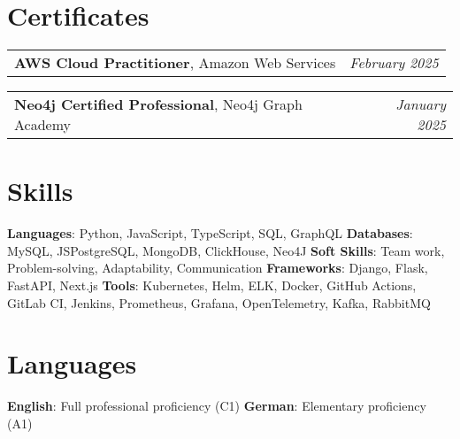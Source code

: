 \documentclass[letterpaper,11pt]{article}
\makeatletter
\newcommand{\titleWithDescription}[2]{\textbf{#1}{: #2}}
\newcommand{\resumeLanguages}[4]{
  \section{Languages}
    \noindent
    \titleWithDescription{#1}{#2}
    \hfill
    \titleWithDescription{#3}{#4}
}
\newcommand{\certificateItem}[3]{
  \begin{tabular*}{1\textwidth}{l@{\extracolsep{\fill}}r}
    \small{
      \textbf{#1}{, #2 \vspace{-2pt}}
    } & \textit{\small #3} \\
  \end{tabular*}\vspace{-12px}
}
\makeatother
\begin{document}
\section{Certificates}

    \certificateItem
      {AWS Cloud Practitioner}
      {Amazon Web Services}
      {February 2025}\vspace{3px}

    \certificateItem
      {Neo4j Certified Professional}
      {Neo4j Graph Academy}
      {January 2025}

%
\section{Skills}

  \titleWithDescription{Languages}{Python, JavaScript, TypeScript, SQL, GraphQL}\vspace{3pt}
  \hfill
  \titleWithDescription{Databases}{MySQL, JSPostgreSQL, MongoDB, ClickHouse, Neo4J}
  \newline
  \titleWithDescription{Soft Skills}{Team work, Problem-solving, Adaptability, Communication}
  \hfill
  \titleWithDescription{Frameworks}{Django, Flask, FastAPI, Next.js}\vspace{3pt}
  \newline
  \titleWithDescription{Tools}{Kubernetes, Helm, ELK, Docker, GitHub Actions, GitLab CI, Jenkins, Prometheus, Grafana, OpenTelemetry, Kafka, RabbitMQ}
\resumeLanguages
  {English}
  {Full professional proficiency (C1)}
  {German}
  {Elementary proficiency (A1)}
\end{document}
